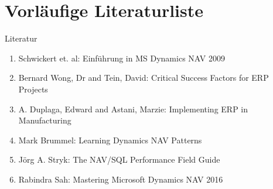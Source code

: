 \chapter{Vorläufige Literaturliste}

Literatur
\begin{enumerate}	
	\item Schwickert et. al: Einführung in MS Dynamics NAV 2009
	\item Bernard Wong, Dr and Tein, David: Critical Success Factors for ERP Projects	
	\item A. Duplaga, Edward and Astani, Marzie: Implementing ERP in Manufacturing
	\item Mark Brummel: Learning Dynamics NAV Patterns
	\item Jörg A. Stryk: The NAV/SQL Performance Field Guide
	\item Rabindra Sah: Mastering Microsoft Dynamics NAV 2016
\end{enumerate}





